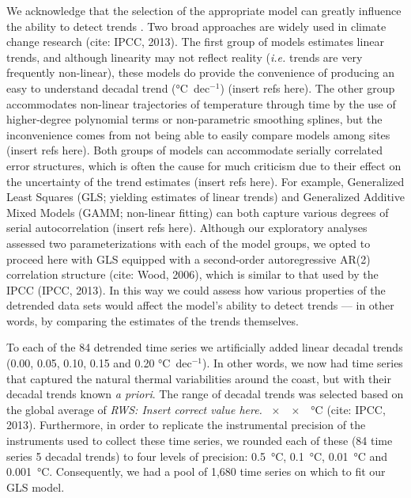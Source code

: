 \documentclass{ametsoc}
\begin{document}
We acknowledge that the selection of the appropriate model can greatly influence the ability to detect trends \citet{Franzke2012}. Two broad approaches are widely used in climate change research (cite: IPCC, 2013). The first group of models estimates linear trends, and although linearity may not reflect reality (\emph{i.e.} trends are very frequently non-linear), these models do provide the convenience of producing an easy to understand decadal trend (\si{\degreeCelsius}~dec$^{-1}$) (insert refs here). The other group accommodates non-linear trajectories of temperature through time by the use of higher-degree polynomial terms or non-parametric smoothing splines, but the inconvenience comes from not being able to easily compare models among sites (insert refs here). Both groups of models can accommodate serially correlated error structures, which is often the cause for much criticism due to their effect on the uncertainty of the trend estimates (insert refs here). For example, Generalized Least Squares (GLS; yielding estimates of linear trends) and Generalized Additive Mixed Models (GAMM; non-linear fitting) can both capture various degrees of serial autocorrelation (insert refs here). Although our exploratory analyses assessed two parameterizations with each of the model groups, we opted to proceed here with GLS equipped with a second-order autoregressive AR(2) correlation structure (cite: Wood, 2006), which is similar to that used by the IPCC (IPCC, 2013). In this way we could assess how various properties of the detrended data sets would affect the model’s ability to detect trends --- in other words, by comparing the estimates of the trends themselves.

To each of the 84 detrended time series we artificially added linear decadal trends (0.00, 0.05, 0.10, 0.15 and 0.20 \si{\degreeCelsius}~dec$^{-1}$). In other words, we now had time series that captured the natural thermal variabilities around the coast, but with their decadal trends known \emph{a priori}. The range of decadal trends was selected based on the global average of \emph{RWS: Insert correct value here.} \SI{xx}{\degreeCelsius} (cite: IPCC, 2013). Furthermore, in order to replicate the instrumental precision of the instruments used to collect these time series, we rounded each of these (84 time series \texttimes{} 5 decadal trends) to four levels of precision: \SI{0.5}{\degreeCelsius}, \SI{0.1}{\degreeCelsius}, \SI{0.01}{\degreeCelsius} and \SI{0.001}{\degreeCelsius}. Consequently, we had a pool of 1,680 time series on which to fit our GLS model.
\end{document}
